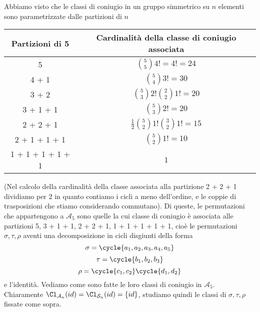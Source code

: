 \documentclass[11pt]{scrartcl}
\begin{document}
	Abbiamo visto che le classi di coniugio in un gruppo simmetrico su $n$ elementi
	sono parametrizzate dalle partizioni di $n$
	\begingroup
	\renewcommand{\arraystretch}{2}
	\begin{center}
		\begin{tabular}{c|c}
			Partizioni di 5 & Cardinalità della classe di coniugio associata\\
			\hline
			5 & $\displaystyle\binom{5}{5}4! = 4! = 24$\\
			4 + 1 & $\displaystyle\binom{5}{4}3! = 30$\\
			3 + 2 & $\displaystyle\binom{5}{3}2!\binom{2}{2}1! = 20$\\
			3 + 1 + 1 & $\displaystyle\binom{5}{3}2! = 20$\\
			2 + 2 + 1 & $\displaystyle\frac 1 2\binom{5}{2}1!\binom{3}{2}1! = 15$\\
			2 + 1 + 1 + 1 & $\displaystyle\binom{5}{2}1! = 10$\\
			1 + 1 + 1 + 1 + 1 & $1$
		\end{tabular}
	\end{center}
	\endgroup
	(Nel calcolo della cardinalità della classe associata alla partizione 2 + 2 + 1
	dividiamo per 2 in quanto contiamo i cicli a meno dell'ordine, e
	le coppie di trasposizioni che stiamo considerando commutano).
	Di queste, le permutazioni che appartengono a $\mathcal{A}_5$ sono quelle
	la cui classe di coniugio è associata alle partizioni 5, 3 + 1 + 1, 
	2 + 2 + 1, 1 + 1 + 1 + 1 + 1, cioè le permutazioni $\sigma, \tau, \rho$
	aventi una decomposizione in cicli disgiunti della forma
	\[
	\sigma = \cycle{a_1, a_2, a_3, a_4, a_5}
	\]
	\[
	\tau = \cycle{b_1, b_2, b_3}
	\]
	\[
	\rho = \cycle{c_1, c_2}\cycle{d_1, d_2}
	\]
	e l'identità. Vediamo come sono fatte le loro classi di coniugio in $\mathcal{A}_5$.
	Chiaramente $\Cl_{\mathcal{A}_n}(id) = \Cl_{\mathcal{S}_n}(id) = \{id\}$, studiamo quindi
	le classi di $\sigma, \tau, \rho$ fissate come sopra.
\end{document}
